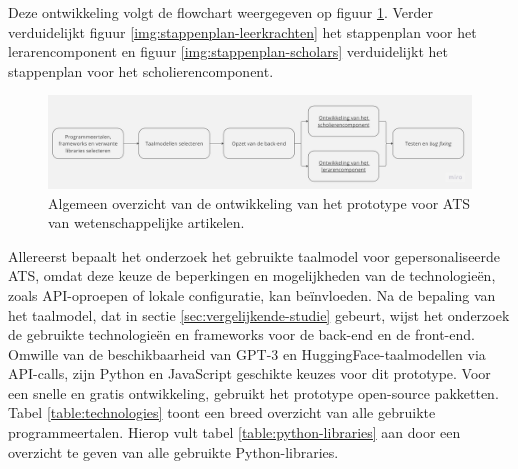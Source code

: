 Deze ontwikkeling volgt de flowchart weergegeven op figuur \ref{img:general-overview-prototype}. Verder verduidelijkt figuur \ref{img:stappenplan-leerkrachten} het stappenplan voor het lerarencomponent en figuur \ref{img:stappenplan-scholars} verduidelijkt het stappenplan voor het scholierencomponent.

\begin{figure}[H]
	\includegraphics[width=\linewidth]{img/flowchart-general-development.jpg}
	\caption{Algemeen overzicht van de ontwikkeling van het prototype voor ATS van wetenschappelijke artikelen.}
	\label{img:general-overview-prototype}
\end{figure}

Allereerst bepaalt het onderzoek het gebruikte taalmodel voor gepersonaliseerde ATS, omdat deze keuze de beperkingen en mogelijkheden van de technologieën, zoals API-oproepen of lokale configuratie, kan beïnvloeden. Na de bepaling van het taalmodel, dat in sectie \ref{sec:vergelijkende-studie} gebeurt, wijst het onderzoek de gebruikte technologieën en frameworks voor de back-end en de front-end. Omwille van de beschikbaarheid van GPT-3 en HuggingFace-taalmodellen via API-calls, zijn Python en JavaScript geschikte keuzes voor dit prototype. Voor een snelle en gratis ontwikkeling, gebruikt het prototype open-source pakketten. Tabel \ref{table:technologies} toont een breed overzicht van alle gebruikte programmeertalen. Hierop vult tabel \ref{table:python-libraries} aan door een overzicht te geven van alle gebruikte Python-libraries.

